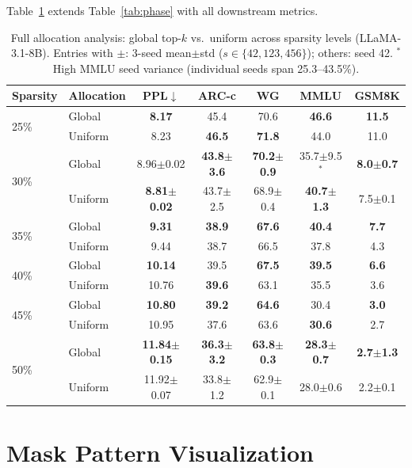 Table~\ref{tab:phase_full} extends Table~\ref{tab:phase} with all downstream metrics.

\begin{table}[t]
\centering
\caption{Full allocation analysis: global top-$k$ vs.\ uniform across sparsity levels (LLaMA-3.1-8B). Entries with $\pm$: 3-seed mean$\pm$std ($s \in \{42, 123, 456\}$); others: seed 42. $^\ast$High MMLU seed variance (individual seeds span 25.3--43.5\%).}
\label{tab:phase_full}
\begin{tabular}{llccccc}
\toprule
Sparsity & Allocation & PPL$\downarrow$ & ARC-c & WG & MMLU & GSM8K \\
\midrule
\multirow{2}{*}{25\%}
& Global & \textbf{8.17} & 45.4 & 70.6 & \textbf{46.6} & \textbf{11.5} \\
& Uniform & 8.23 & \textbf{46.5} & \textbf{71.8} & 44.0 & 11.0 \\
\midrule
\multirow{2}{*}{30\%}
& Global & 8.96$\pm$0.02 & \textbf{43.8$\pm$3.6} & \textbf{70.2$\pm$0.9} & 35.7$\pm$9.5$^\ast$ & \textbf{8.0$\pm$0.7} \\
& Uniform & \textbf{8.81$\pm$0.02} & 43.7$\pm$2.5 & 68.9$\pm$0.4 & \textbf{40.7$\pm$1.3} & 7.5$\pm$0.1 \\
\midrule
\multirow{2}{*}{35\%}
& Global & \textbf{9.31} & \textbf{38.9} & \textbf{67.6} & \textbf{40.4} & \textbf{7.7} \\
& Uniform & 9.44 & 38.7 & 66.5 & 37.8 & 4.3 \\
\midrule
\multirow{2}{*}{40\%}
& Global & \textbf{10.14} & 39.5 & \textbf{67.5} & \textbf{39.5} & \textbf{6.6} \\
& Uniform & 10.76 & \textbf{39.6} & 63.1 & 35.5 & 3.6 \\
\midrule
\multirow{2}{*}{45\%}
& Global & \textbf{10.80} & \textbf{39.2} & \textbf{64.6} & 30.4 & \textbf{3.0} \\
& Uniform & 10.95 & 37.6 & 63.6 & \textbf{30.6} & 2.7 \\
\midrule
\multirow{2}{*}{50\%}
& Global & \textbf{11.84$\pm$0.15} & \textbf{36.3$\pm$3.2} & \textbf{63.8$\pm$0.3} & \textbf{28.3$\pm$0.7} & \textbf{2.7$\pm$1.3} \\
& Uniform & 11.92$\pm$0.07 & 33.8$\pm$1.2 & 62.9$\pm$0.1 & 28.0$\pm$0.6 & 2.2$\pm$0.1 \\
\bottomrule
\end{tabular}
\end{table}


\section{Mask Pattern Visualization}
\label{app:mask_viz}

